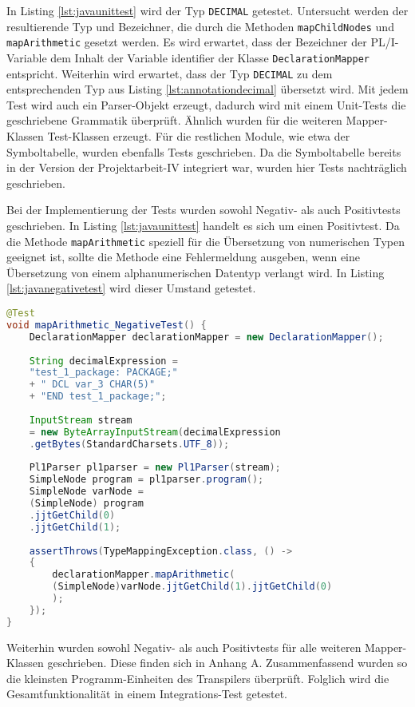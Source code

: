 In Listing \ref{lst:javaunittest}  wird der Typ \verb+DECIMAL+ getestet. Untersucht werden der resultierende Typ und Bezeichner, die durch die Methoden \verb+mapChildNodes+ und \verb+mapArithmetic+ gesetzt werden. Es wird erwartet, dass der Bezeichner der PL/I-Variable dem Inhalt der Variable identifier der Klasse \verb+DeclarationMapper+ entspricht.
Weiterhin wird erwartet, dass der Typ \verb+DECIMAL+ zu dem entsprechenden Typ aus Listing \ref{lst:annotationdecimal} übersetzt wird.
Mit jedem Test wird auch ein Parser-Objekt erzeugt, dadurch wird  mit einem Unit-Tests die geschriebene Grammatik überprüft.
Ähnlich wurden  für die weiteren Mapper-Klassen Test-Klassen erzeugt.
Für die restlichen Module, wie etwa der Symboltabelle, wurden ebenfalls Tests geschrieben.
Da die Symboltabelle bereits in der Version der Projektarbeit-IV integriert war, wurden hier  Tests nachträglich geschrieben. 

Bei der Implementierung der Tests wurden sowohl Negativ- als auch Positivtests geschrieben.
In Listing \ref{lst:javaunittest} handelt es sich um einen Positivtest. Da die Methode \verb+mapArithmetic+ speziell für die Übersetzung von numerischen Typen geeignet ist, sollte die Methode eine Fehlermeldung ausgeben, wenn eine Übersetzung von einem alphanumerischen Datentyp verlangt wird.  In Listing \ref{lst:javanegativetest} wird dieser Umstand getestet. 

\begin{lstlisting}[language=Java, caption=Negativ-Test für die Übersetzung eines Arithmetischen Ausdrucks, label={lst:javanegativetest}]
@Test
void mapArithmetic_NegativeTest() {
	DeclarationMapper declarationMapper = new DeclarationMapper();
	
	String decimalExpression = 
	"test_1_package: PACKAGE;" 
	+ "	DCL var_3 CHAR(5)" 
	+ "END test_1_package;";
	
	InputStream stream
	= new ByteArrayInputStream(decimalExpression
	.getBytes(StandardCharsets.UTF_8));
		
	Pl1Parser pl1parser = new Pl1Parser(stream);
	SimpleNode program = pl1parser.program();
	SimpleNode varNode = 
	(SimpleNode) program
	.jjtGetChild(0)
	.jjtGetChild(1);
		
	assertThrows(TypeMappingException.class, () -> 
	{
		declarationMapper.mapArithmetic(
		(SimpleNode)varNode.jjtGetChild(1).jjtGetChild(0)
		);
	});
}
\end{lstlisting}

Weiterhin wurden sowohl Negativ- als auch Positivtests für alle weiteren Mapper-Klassen geschrieben. Diese finden sich in Anhang A.
Zusammenfassend wurden so die kleinsten Programm-Einheiten des Transpilers überprüft. 
Folglich wird die Gesamtfunktionalität in einem Integrations-Test getestet.

